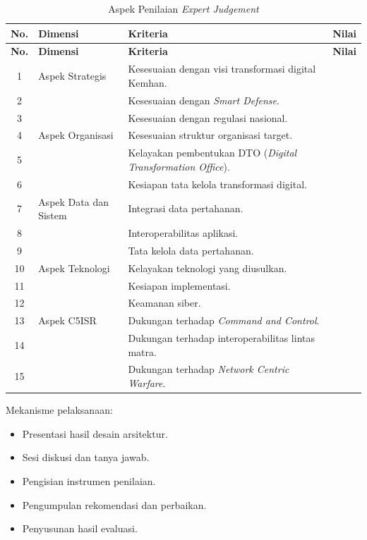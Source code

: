 \begin{longtable}{|c|p{3.2cm}|p{7cm}|c|}
\caption{Aspek Penilaian \textit{Expert Judgement}}
\label{tab:aspek-penilaian} \\
\hline
\textbf{No.} & \textbf{Dimensi} & \textbf{Kriteria} & \textbf{Nilai} \\
\hline
\endfirsthead
\hline
\textbf{No.} & \textbf{Dimensi} & \textbf{Kriteria} & \textbf{Nilai} \\
\hline
\endhead
1 & Aspek Strategis & Kesesuaian dengan visi transformasi digital Kemhan. & \\
\hline
2 & & Kesesuaian dengan \textit{Smart Defense}. & \\
\hline
3 & & Kesesuaian dengan regulasi nasional. & \\
\hline
4 & Aspek Organisasi & Kesesuaian struktur organisasi target. & \\
\hline
5 & & Kelayakan pembentukan DTO (\textit{Digital Transformation Office}). & \\
\hline
6 & & Kesiapan tata kelola transformasi digital. & \\
\hline
7 & Aspek Data dan Sistem & Integrasi data pertahanan. & \\
\hline
8 & & Interoperabilitas aplikasi. & \\
\hline
9 & & Tata kelola data pertahanan. & \\
\hline
10 & Aspek Teknologi & Kelayakan teknologi yang diusulkan. & \\
\hline
11 & & Kesiapan implementasi. & \\
\hline
12 & & Keamanan siber. & \\
\hline
13 & Aspek C5ISR & Dukungan terhadap \textit{Command and Control}. & \\
\hline
14 & & Dukungan terhadap interoperabilitas lintas matra. & \\
\hline
15 & & Dukungan terhadap \textit{Network Centric Warfare}. & \\
\hline
\end{longtable}

Mekanisme pelaksanaan:
\begin{itemize}
  \item Presentasi hasil desain arsitektur.
  \item Sesi diskusi dan tanya jawab.
  \item Pengisian instrumen penilaian.
  \item Pengumpulan rekomendasi dan perbaikan.
  \item Penyusunan hasil evaluasi.
\end{itemize}

